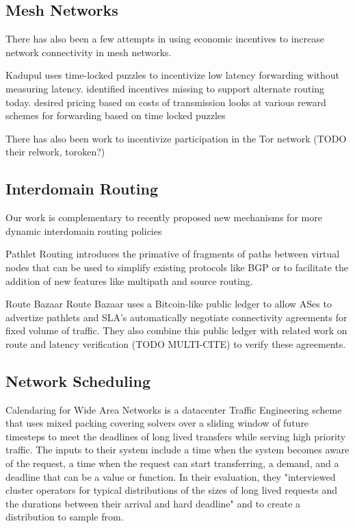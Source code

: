 \subsection{Mesh Networks}
There has also been a few attempts in using economic incentives to increase network connectivity in mesh networks.

Kadupul \cite{kadupul15} uses time-locked puzzles to incentivize low latency forwarding without measuring latency.
identified incentives missing to support alternate routing today. desired pricing based on costs of transmission
looks at various reward schemes for forwarding based on time locked puzzles

There has also been work to incentivize participation in the Tor network\cite{torpath14, onions14} (TODO their relwork, toroken?)

\subsection{Interdomain Routing}
Our work is complementary to recently proposed new mechanisms for more dynamic interdomain routing policies

Pathlet Routing \cite{pathlet09} introduces the primative of fragments of paths between virtual nodes that can be used to simplify existing protocols like BGP or to facilitate the addition of new features like multipath and source routing.

Route Bazaar \cite{routebazaar15}
Route Bazaar uses a Bitcoin-like public ledger to allow ASes to advertize pathlets and SLA's automatically negotiate connectivity agreements for fixed volume of traffic. They also combine this public ledger with related work on route and latency verification (TODO MULTI-CITE) to verify these agreements.


\subsection{Network Scheduling}
Calendaring for Wide Area Networks \cite{tempus14}
is a datacenter Traffic Engineering scheme that uses mixed packing covering solvers over a sliding window of future timesteps to meet the deadlines of long lived transfers while serving high priority traffic.
The inputs to their system include a time when the system becomes aware of the request, a time when the request can start transferring, a demand, and a deadline that can be a value or function.
In their evaluation, they "interviewed cluster operators for typical distributions of the sizes of long lived requests and the durations between their arrival and hard deadline" and to create a distribution to sample from.

